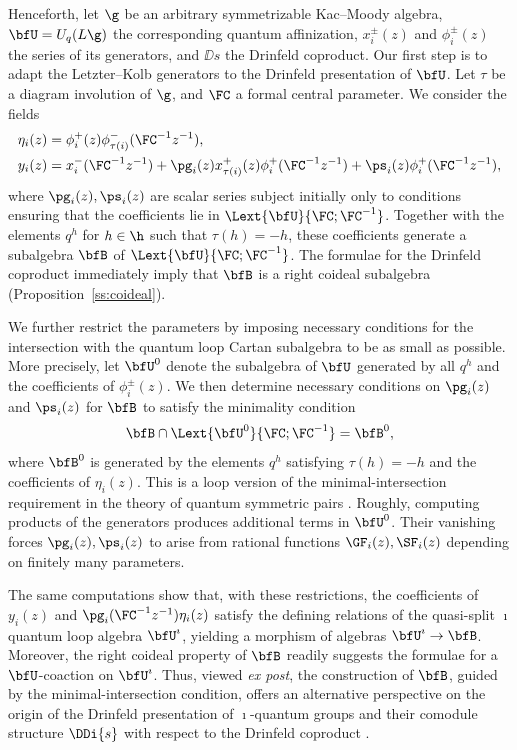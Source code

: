 \documentclass[reqno]{amsart}
\numberwithin{equation}{section}
\begin{document}
\subsection{}
Henceforth, let $\g$ be an arbitrary symmetrizable Kac--Moody algebra,
$\bfU=U_q(L\g)$ the corresponding quantum affinization, $x_i^\pm(z)$ and $\phi_i^\pm(z)$ the series of its generators, and $\DD{s}$ the Drinfeld 
coproduct. Our first step is to adapt the Letzter--Kolb generators to the Drinfeld 
presentation of $\bfU$.
Let $\tau$ be a diagram involution of $\g$, and $\FC$ a formal central parameter.
We consider the fields
	\begin{align}
		\eta_i(z)&=\phi_i^+(z)\phi_{\tau(i)}^-(\FC^{-1}z^{-1}),\\ \label{eq:intro-coideal-generators}
		y_i(z)&=x_i^-(\FC^{-1}z^{-1})
		+\pg_i(z)x_{\tau(i)}^+(z)\phi_i^+(\FC^{-1}z^{-1})
		+\ps_i(z)\phi_i^+(\FC^{-1}z^{-1}),
	\end{align}
where $\pg_i(z),\ps_i(z)$ are scalar series subject initially only to conditions ensuring that the coefficients lie in $\Lext{\bfU}{\FC;\FC^{-1}}$.
Together with the elements $q^h$ for $h\in\h$ such that $\tau(h)=-h$, these coefficients generate a subalgebra $\bfB$ of $\Lext{\bfU}{\FC;\FC^{-1}}$.
The formulae for the Drinfeld coproduct immediately imply that $\bfB$ is a right coideal subalgebra (Proposition~\ref{ss:coideal}).

We further restrict the parameters by imposing necessary conditions for the intersection with the quantum loop Cartan subalgebra to be as small as possible. More precisely, let $\bfU^0$ denote the subalgebra of $\bfU$ generated by all $q^h$ and the coefficients of $\phi_i^\pm(z)$. We then determine necessary conditions on $\pg_i(z)$ and $\ps_i(z)$ for $\bfB$ to satisfy the minimality condition
\begin{equation}\label{eq:intro-minimality}
	\bfB\cap\Lext{\bfU^0}{\FC;\FC^{-1}}=\bfB^0,
\end{equation}
where $\bfB^0$ is generated by the elements $q^h$ satisfying $\tau(h)=-h$ and the coefficients of $\eta_i(z)$.
This is a loop version of the minimal-intersection requirement in the theory of 
quantum symmetric pairs \cite{letzter-02,kolb-14,regelskis-vlaar-20}.
Roughly, computing products of the generators produces additional terms in 
$\bfU^0$. Their vanishing forces $\pg_i(z),\ps_i(z)$ to arise from rational functions 
$\GF_i(z),\SF_i(z)$ depending on finitely many parameters.

The same computations show that, with these restrictions,
the coefficients of $y_i(z)$ and $\pg_i(\FC^{-1}z^{-1})\eta_i(z)$ satisfy the defining relations of the quasi-split $\imath$quantum loop algebra $\bfU^\imath$, yielding a morphism of algebras $\bfU^\imath\to\bfB$. Moreover, the right coideal property of $\bfB$ readily suggests the formulae for a $\bfU$-coaction on $\bfU^\imath$.
Thus, viewed \emph{ex post}, the construction of $\bfB$, guided by the minimal-intersection condition, offers an alternative perspective on the origin of the Drinfeld presentation of $\imath$-quantum groups  and their comodule structure
$\DDi{s}$ with respect to the Drinfeld coproduct \cite{lu-pan-26}.
\end{document}
